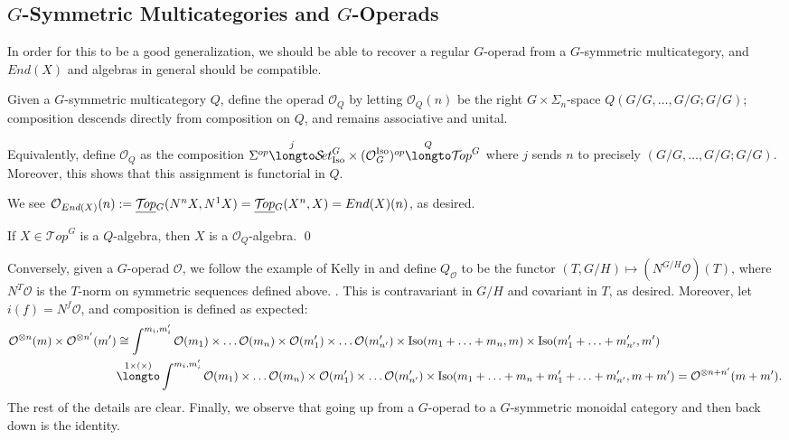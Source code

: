 \documentclass{report}
\newcommand{\Top}{\text{$\mathcal{T}\!op$}}
\newcommand{\Set}{\text{$\mathcal{S}\!et$}}
\DeclareMathOperator{\Iso}{Iso}
\newcommand{\TopG}{\text{\underline{$\Top$}$_G$}}
\newcommand{\SetGI}{\text{$\Set^G_{\mbox{\scriptsize Iso}}$}}
\renewcommand{\O}{\text{$\mathcal{O}$}}
\begin{document}
\subsection{$G$-Symmetric Multicategories and $G$-Operads}
In order for this to be a good generalization, we should be able to recover a regular $G$-operad from a $G$-symmetric multicategory, and $End(X)$ and algebras in general should be compatible.
\begin{defn}
  Given a $G$-symmetric multicategory $Q$, define the operad $\O_Q$ by letting $\O_Q(n)$ be the right $G\times\Sigma_n$-space $Q(G/G,\ldots, G/G; G/G)$; composition descends directly from composition on $Q$, and remains associative and unital. 
\end{defn}
Equivalently, define $\O_Q$ as the composition $\Sigma^{op}\overset{j}{\longto}\SetGI\times(\OGI)^{op}\overset{Q}{\longto} \Top^G$ where $j$ sends $n$ to precisely $(G/G,\ldots, G/G; G/G)$. Moreover, this shows that this assignment is functorial in $Q$.

\begin{example}
  We see $\O_{End(X)}(n) := \TopG(N^nX,N^1X) =\TopG(X^n,X) = End(X)(n)$, as desired.  
\end{example}
\begin{prop}
  If $X\in\Top^G$ is a $Q$-algebra, then $X$ is a $\O_Q$-algebra. \qed
\end{prop}

Conversely, given a $G$-operad $\O$, we follow the example of Kelly in \cite{kelly_operads_2005} and define $Q_\O$ to be the functor $(T,G/H)\mapsto (N^{G/H}\O)(T)$, where $N^T\O$ is the $T$-norm on symmetric sequences defined above. . This is contravariant in $G/H$ and covariant in $T$, as desired. Moreover, let $i(f) = N^f\O$, and composition is defined as expected:
\begin{align*}
  \O^{\otimes n}(m)\times \O^{\otimes n'}(m') &\cong \int^{m_i,m'_i}\O(m_1)\times\ldots\O(m_n)\times\O(m'_1)\times\ldots\O(m'_{n'})\times \Iso(m_1+\ldots+m_n,m)\times \Iso(m'_1+\ldots+m'_{n'},m')\\
  &\overset{1\times (\times)}{\longto} \int^{m_i,m'_i}\O(m_1)\times\ldots\O(m_n)\times\O(m'_1)\times\ldots\O(m'_{n'})\times \Iso(m_1+\ldots+m_n+m'_1+\ldots+m'_{n'},m+m') = \O^{\otimes n+n'}(m+m').
\end{align*}
The rest of the details are clear. Finally, we observe that going up from a $G$-operad to a $G$-symmetric monoidal category and then back down is the identity. 
\end{document}
